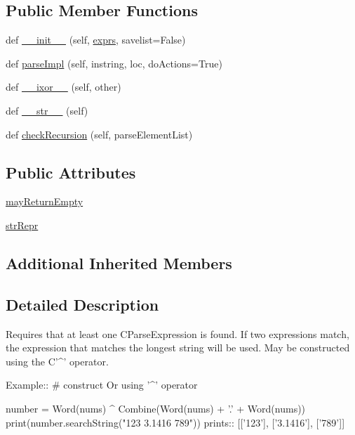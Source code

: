 \subsection*{Public Member Functions}
\begin{DoxyCompactItemize}
\item 
def \hyperlink{classpkg__resources_1_1__vendor_1_1pyparsing_1_1Or_a212a05688c290595d8ad7020bcaff634}{\+\_\+\+\_\+init\+\_\+\+\_\+} (self, \hyperlink{classpkg__resources_1_1__vendor_1_1pyparsing_1_1ParseExpression_ae9e07a06d183190717e964e7ff907363}{exprs}, savelist=False)
\item 
def \hyperlink{classpkg__resources_1_1__vendor_1_1pyparsing_1_1Or_ad5892cd5acb9b39df835cb1031f05cdf}{parse\+Impl} (self, instring, loc, do\+Actions=True)
\item 
def \hyperlink{classpkg__resources_1_1__vendor_1_1pyparsing_1_1Or_a6a15222b5a1759e4e7a222d1a3e33b88}{\+\_\+\+\_\+ixor\+\_\+\+\_\+} (self, other)
\item 
def \hyperlink{classpkg__resources_1_1__vendor_1_1pyparsing_1_1Or_a3b8a60a0f29fb71fe31a0436d83c8e67}{\+\_\+\+\_\+str\+\_\+\+\_\+} (self)
\item 
def \hyperlink{classpkg__resources_1_1__vendor_1_1pyparsing_1_1Or_ab91469b6c2dca271fb8dd0e5e25acbfd}{check\+Recursion} (self, parse\+Element\+List)
\end{DoxyCompactItemize}
\subsection*{Public Attributes}
\begin{DoxyCompactItemize}
\item 
\hyperlink{classpkg__resources_1_1__vendor_1_1pyparsing_1_1Or_a796f8a67719705c07ba78e9b1dcdc5c8}{may\+Return\+Empty}
\item 
\hyperlink{classpkg__resources_1_1__vendor_1_1pyparsing_1_1Or_a922e28b586173a8c73cdcd93fc29cd47}{str\+Repr}
\end{DoxyCompactItemize}
\subsection*{Additional Inherited Members}


\subsection{Detailed Description}
\begin{DoxyVerb}Requires that at least one C{ParseExpression} is found.
If two expressions match, the expression that matches the longest string will be used.
May be constructed using the C{'^'} operator.

Example::
    # construct Or using '^' operator
    
    number = Word(nums) ^ Combine(Word(nums) + '.' + Word(nums))
    print(number.searchString("123 3.1416 789"))
prints::
    [['123'], ['3.1416'], ['789']]
\end{DoxyVerb}
 

